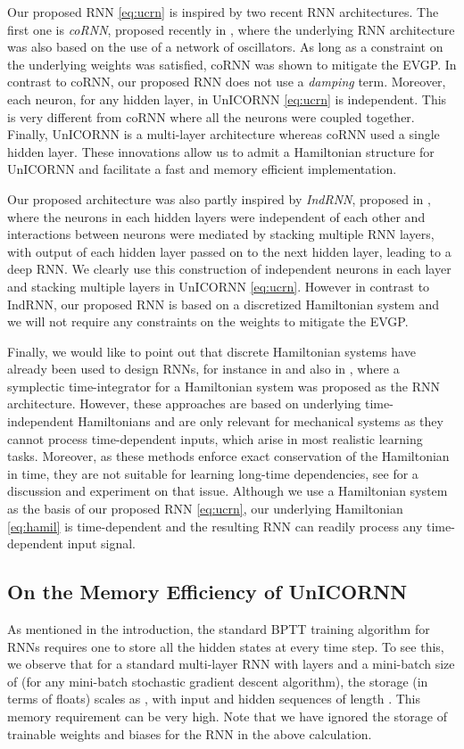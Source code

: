 \documentclass{article}
\begin{document}
Our proposed RNN \eqref{eq:ucrn} is inspired by two recent RNN architectures. The first one is \emph{coRNN}, proposed recently in \cite{coRNN}, where the underlying RNN architecture was also based on the use of a network of oscillators. As long as a constraint on the underlying weights was satisfied, coRNN was shown to mitigate the EVGP. In contrast to coRNN, our proposed RNN does not use a \emph{damping} term. Moreover, each neuron, for any hidden layer, in UnICORNN \eqref{eq:ucrn} is independent. This is very different from coRNN where all the neurons were coupled together. Finally, UnICORNN is a multi-layer architecture whereas coRNN used a single hidden layer. These innovations allow us to admit a Hamiltonian structure for UnICORNN and facilitate a fast and memory efficient implementation. 

Our proposed architecture was also partly inspired by \emph{IndRNN}, proposed in \cite{indrnn,deep_indrnn}, where the neurons in each hidden layers were independent of each other and interactions between neurons were mediated by stacking multiple RNN layers, with output of each hidden layer passed on to the next hidden layer, leading to a deep RNN. We clearly use this construction of independent neurons in each layer and stacking multiple layers in UnICORNN \eqref{eq:ucrn}. However in contrast to IndRNN, our proposed RNN is based on a discretized Hamiltonian system and we will not require any constraints on the weights to mitigate the EVGP.

Finally, we would like to point out that discrete Hamiltonian systems have already been used to design RNNs, for instance in \cite{hnn} and also in \cite{srnn}, where a symplectic time-integrator for a Hamiltonian system was proposed as the RNN architecture. However, these approaches are based on underlying time-independent Hamiltonians and are only relevant for mechanical systems as they cannot process time-dependent inputs, which arise in most realistic learning tasks. Moreover, as these methods enforce exact conservation of the Hamiltonian in time, they are not suitable for learning long-time dependencies, see \cite{inv_lstm} for a discussion and experiment on that issue. Although we use a Hamiltonian system as the basis of our proposed RNN \eqref{eq:ucrn}, our underlying Hamiltonian \eqref{eq:hamil} is time-dependent and the resulting RNN can readily process any time-dependent input signal. 
\subsection{On the Memory Efficiency of UnICORNN}
As mentioned in the introduction, the standard BPTT training algorithm for RNNs requires one to store all the hidden states at every time step. To see this, we observe that for a standard multi-layer RNN with  layers and a mini-batch size of  (for any mini-batch stochastic gradient descent algorithm), the storage (in terms of floats) scales as , with input and hidden sequences of length . This memory requirement can be very high. Note that we have ignored the storage of trainable weights and biases for the RNN in the above calculation.
\end{document}
